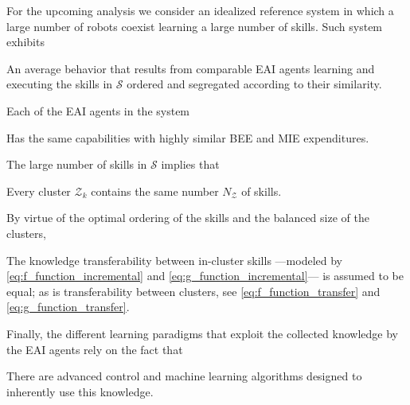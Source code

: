 For the upcoming analysis we consider an idealized reference system in which a large number of robots coexist learning a large number of skills. Such system exhibits
\begin{tcolorbox}
	\begin{assumption}\label{assumption:average_behavior}
		An average behavior that results from comparable EAI agents learning and executing the skills in $\mathcal{S}$ ordered and segregated according to their similarity.
	\end{assumption}
\end{tcolorbox}
Each of the EAI agents in the system
\begin{tcolorbox}
	\begin{assumption}\label{assumption:agent_similarity}
		Has the same capabilities with highly similar BEE and MIE expenditures.
	\end{assumption}
\end{tcolorbox}
The large number of skills in $\mathcal{S}$ implies that
\begin{tcolorbox}
	\begin{assumption}\label{assumption:cluster_size}
		Every cluster $\mathcal{Z}_{k}$ contains the same number $N_{\mathcal{Z}} $ of skills.
	\end{assumption}
\end{tcolorbox}
By virtue of the optimal ordering of the skills and the balanced size of the clusters,
\begin{tcolorbox}
	\begin{assumption}\label{assumption:cluster_transferability}
		The knowledge transferability between in-cluster skills ---modeled by \eqref{eq:f_function_incremental} and \eqref{eq:g_function_incremental}--- is assumed to be equal; as is transferability between clusters, see \eqref{eq:f_function_transfer} and \eqref{eq:g_function_transfer}.
	\end{assumption}
\end{tcolorbox}
Finally, the different learning paradigms that exploit the collected knowledge by the EAI agents rely on the fact that
\begin{tcolorbox}
	\begin{assumption}\label{assumption:enabling_agorithms}
	There are advanced control and machine learning algorithms designed to inherently use this knowledge.
	\end{assumption}
\end{tcolorbox}

